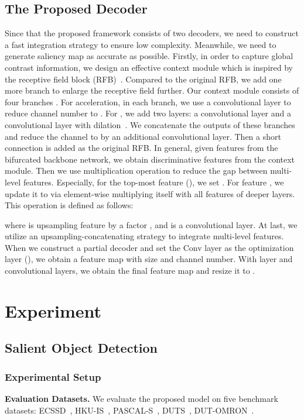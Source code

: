\documentclass[10pt,twocolumn,letterpaper]{article}
\begin{document}
\subsection{The Proposed Decoder}\label{3.3}
Since that the proposed framework consists of two decoders, we need to construct a fast integration strategy to ensure low complexity. Meanwhile, we need to generate saliency map as accurate as possible. Firstly, in order to capture global contrast information, we design an effective context module which is inspired by the receptive field block (RFB)~\cite{2018RFB}. Compared to the original RFB, we add one more branch to enlarge the receptive field further. Our context module consists of four branches . For acceleration, in each branch, we use a  convolutional layer to reduce channel number to . For , we add two layers: a  convolutional layer and a  convolutional layer with  dilation~\cite{2018DeepLab}. We concatenate the outputs of these branches and reduce the channel to  by an additional  convolutional layer. Then a short connection is added as the original RFB. In general, given features  from the bifurcated backbone network, we obtain discriminative features  from the context module. Then we use multiplication operation to reduce the gap between multi-level features. Especially, for the top-most feature (), we set . For feature , we update it to  via element-wise multiplying itself with all features of deeper layers. This operation is defined as follows:

where  is upsampling feature by a factor , and  is a  convolutional layer. At last, we utilize an upsampling-concatenating strategy to integrate multi-level features. When we construct a partial decoder and set the Conv layer as the optimization layer (), we obtain a feature map with  size and  channel number. With  layer and  convolutional layers, we obtain the final feature map and resize it to .

\section{Experiment}
\subsection{Salient Object Detection}
\subsubsection{Experimental Setup}
\textbf{Evaluation Datasets. }We evaluate the proposed model on five benchmark datasets: ECSSD~\cite{Dataset-ECSSD}, HKU-IS~\cite{2015MDF}, PASCAL-S~\cite{Dataset-PASCAL-S}, DUTS~\cite{Dataset-DUTS}, DUT-OMRON~\cite{Dataset-DUT-OMRON}.
\end{document}
